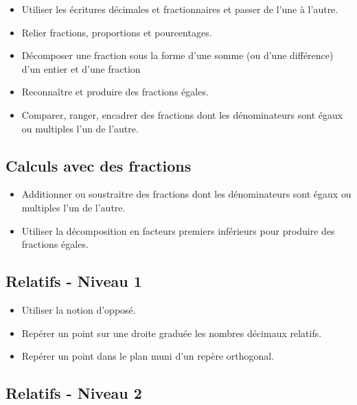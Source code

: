 \documentclass[a4paper,12pt,fleqn]{article}
\begin{document}
\begin{itemize}[itemsep=1em]																									
	\item {}	Utiliser les écritures décimales et fractionnaires et passer de l’une à l’autre.																								
	\item {}	Relier fractions, proportions et pourcentages.																								
	\item {}	Décomposer une fraction sous la forme d’une somme (ou d’une différence) d’un entier et d'une fraction																								
	\item {}	Reconnaître et produire des fractions égales.																								
	\item {}	Comparer, ranger, encadrer des fractions dont les dénominateurs sont égaux ou multiples l’un de l'autre.
\end{itemize}

\subsection*{Calculs avec des fractions}

\begin{itemize}[itemsep=1em]							
	\item {}	Additionner ou soustraitre des fractions dont les dénominateurs sont égaux ou multiples l’un de l’autre.																								
	\item {}	Utiliser la décomposition en facteurs premiers inférieurs pour produire des fractions égales.	
\end{itemize}

\newpage
\subsection*{Relatifs - Niveau 1}

\begin{itemize}[itemsep=1em]																								
	\item {}	Utiliser la notion d'opposé.																								
	\item {}	Repérer un point sur une droite graduée les nombres décimaux relatifs.																								
	\item {}	Repérer un point dans le plan muni d’un repère orthogonal.		
\end{itemize}

\subsection*{Relatifs - Niveau 2}
\end{document}
